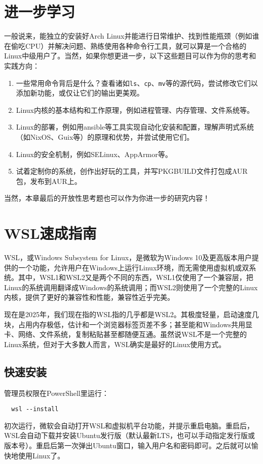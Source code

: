 \section{进一步学习}

一般说来，能独立的安装好Arch Linux并能进行日常维护、找到性能瓶颈（例如谁在偷吃CPU）并解决问题、熟练使用各种命令行工具，就可以算是一个合格的Linux中级用户了。当然，如果你想更进一步，以下这些题目可以作为你的思考和实践方向：
\begin{enumerate}
  \item 一些常用命令背后是什么？查看诸如\texttt{ls}、\texttt{cp}、\texttt{mv}等的源代码，尝试修改它们以添加新功能，或仅让它们的输出更美观。
  \item Linux内核的基本结构和工作原理，例如进程管理、内存管理、文件系统等。
  \item Linux的部署，例如用ansible等工具实现自动化安装和配置，理解声明式系统（如NixOS、Guix等）的原理和优势，并尝试使用它们。
  \item Linux的安全机制，例如SELinux、AppArmor等。
  \item 试着定制你的系统，创作出好玩的工具，并写PKGBUILD文件打包成AUR包，发布到AUR上。
\end{enumerate}

当然，本章最后的开放性思考题也可以作为你进一步的研究内容！

\section{WSL速成指南}

WSL，或Windows Subsystem for Linux，是微软为Windows 10及更高版本用户提供的一个功能，允许用户在Windows上运行Linux环境，而无需使用虚拟机或双系统。其中，WSL1和WSL2又是两个不同的东西，WSL1仅使用了一个兼容层，把Linux的系统调用翻译成Windows的系统调用；而WSL2则使用了一个完整的Linux内核，提供了更好的兼容性和性能，兼容性近乎完美。

现在是2025年，我们现在指的WSL指的几乎都是WSL2。其极度轻量，启动速度几块，占用内存极低，估计和一个浏览器标签页差不多；甚至能和Windows共用显卡、网络、文件系统，复制粘贴甚至都随便互通。虽然说WSL不是一个完整的Linux系统，但对于大多数人而言，WSL确实是最好的Linux使用方式。

\subsection{快速安装}

管理员权限在PowerShell里运行：
\begin{lstlisting}
  wsl --install
\end{lstlisting}
初次运行，微软会自动打开WSL和虚拟机平台功能，并提示重启电脑。重启后，WSL会自动下载并安装Ubuntu发行版（默认最新LTS，也可以手动指定发行版或版本号）。重启后第一次弹出Ubuntu窗口，输入用户名和密码即可。之后就可以愉快地使用Linux了。

